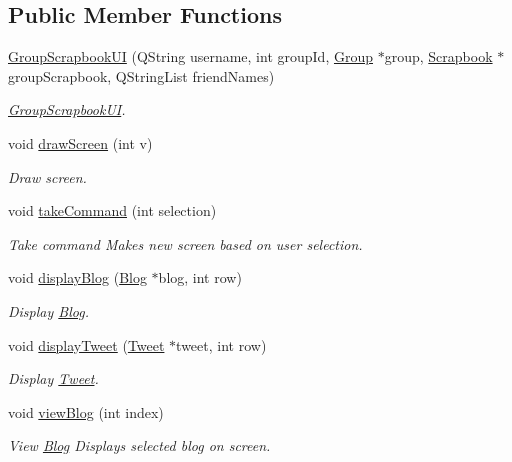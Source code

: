 \subsection*{Public Member Functions}
\begin{DoxyCompactItemize}
\item 
\hyperlink{classGroupScrapbookUI_a48803a826aeb821546a02770b31e13bb}{Group\+Scrapbook\+UI} (Q\+String username, int group\+Id, \hyperlink{classGroup}{Group} $\ast$group, \hyperlink{classScrapbook}{Scrapbook} $\ast$group\+Scrapbook, Q\+String\+List friend\+Names)
\begin{DoxyCompactList}\small\item\em \hyperlink{classGroupScrapbookUI}{Group\+Scrapbook\+UI}. \end{DoxyCompactList}\item 
void \hyperlink{classGroupScrapbookUI_a3faeeff0a07f521520066f75a7f1b225}{draw\+Screen} (int v)
\begin{DoxyCompactList}\small\item\em Draw screen. \end{DoxyCompactList}\item 
void \hyperlink{classGroupScrapbookUI_afb2b9aae788b199fc621b7b11f208504}{take\+Command} (int selection)
\begin{DoxyCompactList}\small\item\em Take command Makes new screen based on user selection. \end{DoxyCompactList}\item 
void \hyperlink{classGroupScrapbookUI_abd2e2425a95a6251066f3ff14f335d27}{display\+Blog} (\hyperlink{classBlog}{Blog} $\ast$blog, int row)
\begin{DoxyCompactList}\small\item\em Display \hyperlink{classBlog}{Blog}. \end{DoxyCompactList}\item 
void \hyperlink{classGroupScrapbookUI_ac326e65f4fef7fefb7b0b5284e1653df}{display\+Tweet} (\hyperlink{classTweet}{Tweet} $\ast$tweet, int row)
\begin{DoxyCompactList}\small\item\em Display \hyperlink{classTweet}{Tweet}. \end{DoxyCompactList}\item 
void \hyperlink{classGroupScrapbookUI_a5195f5a6fbdd6cc8d90348f57322d36c}{view\+Blog} (int index)
\begin{DoxyCompactList}\small\item\em View \hyperlink{classBlog}{Blog} Displays selected blog on screen. \end{DoxyCompactList}\item 

\end{DoxyCompactItemize}
